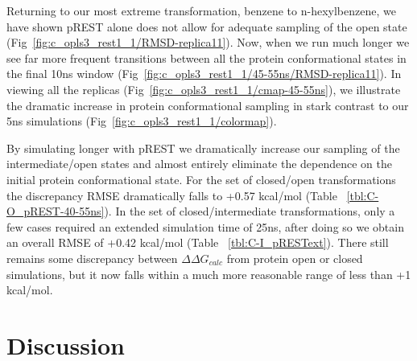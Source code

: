 \documentclass[journal=jctcce,manuscript=article]{achemso}
\begin{document}
Returning to our most extreme transformation, benzene to n-hexylbenzene, we have shown pREST alone does not allow for adequate sampling of the open state (Fig~\ref{fig:c_opls3_rest1_1/RMSD-replica11}).
Now, when we run much longer we see far more frequent transitions between all the protein conformational states in the final 10ns window (Fig~\ref{fig:c_opls3_rest1_1/45-55ns/RMSD-replica11}).
In viewing all the replicas (Fig~\ref{fig:c_opls3_rest1_1/cmap-45-55ns}), we illustrate the dramatic increase in protein conformational sampling in stark contrast to our 5ns simulations (Fig~\ref{fig:c_opls3_rest1_1/colormap}). 

By simulating longer with pREST we dramatically increase our sampling of the intermediate/open states and almost entirely eliminate the dependence on the initial protein conformational state.
For the set of closed/open transformations the discrepancy RMSE dramatically falls to +0.57 kcal/mol (Table ~\ref{tbl:C-O_pREST-40-55ns}).
In the set of closed/intermediate transformations, only a few cases required an extended simulation time of 25ns, after doing so we obtain an overall RMSE of +0.42 kcal/mol (Table ~\ref{tbl:C-I_pRESText}). 
There still remains some discrepancy between $\Delta\Delta G_{calc}$ from protein open or closed simulations, but it now falls within a much more reasonable range of less than +1 kcal/mol. 
 
\section{Discussion}
\end{document}
